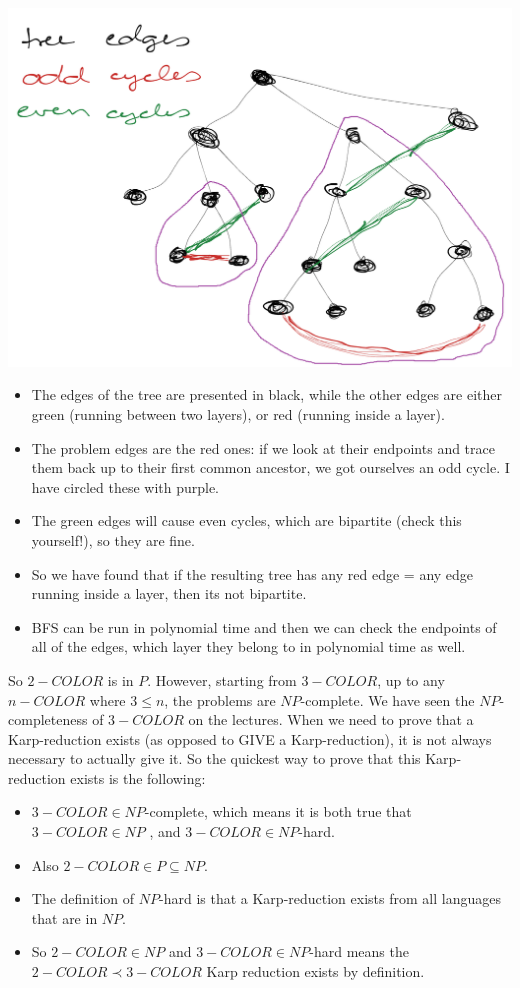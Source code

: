 \begin{center}
\includegraphics[width=0.8\linewidth]{./08/01/bipartite_bfs.png}
\end{center}

\begin{itemize}
    \item The edges of the tree are presented in black, while the other edges are either green (running between two layers), or red (running inside a layer).
    \item The problem edges are the red ones: if we look at their endpoints and trace them back up to their first common ancestor, we got ourselves an odd cycle. I have circled these with purple.
    \item The green edges will cause even cycles, which are bipartite (check this yourself!), so they are fine.
    \item So we have found that if the resulting tree has any red edge = any edge running inside a layer, then its not bipartite.
    \item BFS can be run in polynomial time and then we can check the endpoints of all of the edges, which layer they belong to in polynomial time as well.
\end{itemize}

So $2-COLOR$ is in $P$. However, starting from $3-COLOR$, up to any $n-COLOR$ where $3\leq{}n$, the problems are $NP$-complete. We have seen the $NP$-completeness of $3-COLOR$ on the lectures. When we need to prove that a Karp-reduction exists (as opposed to GIVE a Karp-reduction), it is not always necessary to actually give it. So the quickest way to prove that this Karp-reduction exists is the following:
\begin{itemize}
    \item $3-COLOR \in{} NP$-complete, which means it is both true that $3-COLOR \in{} NP$ , and $3-COLOR \in{} NP$-hard.
    \item Also $2-COLOR \in{} P \subseteq{} NP$.
    \item The definition of $NP$-hard is that a Karp-reduction exists from all languages that are in $NP$.
    \item So $2-COLOR \in{} NP$ and $3-COLOR \in{} NP$-hard means the $2-COLOR \prec 3-COLOR$ Karp reduction exists by definition.
\end{itemize}

